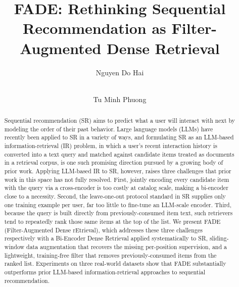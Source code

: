 \documentclass[runningheads]{llncs}
\begin{document}
%
\title{FADE: Rethinking Sequential Recommendation as Filter-Augmented Dense Retrieval}
%
%
\author{Nguyen Do Hai \and \\  Tu Minh Phuong}
%
%
%
\maketitle
%
\begin{abstract}
Sequential recommendation (SR) aims to predict what a user will interact with next by modeling the order of their past behavior. Large language models (LLMs) have recently been applied to SR in a variety of ways, and formulating SR as an LLM-based information-retrieval (IR) problem, in which a user's recent interaction history is converted into a text query and matched against candidate items treated as documents in a retrieval corpus, is one such promising direction pursued by a growing body of prior work. Applying LLM-based IR to SR, however, raises three challenges that prior work in this space has not fully resolved. First, jointly encoding every candidate item with the query via a cross-encoder is too costly at catalog scale, making a bi-encoder close to a necessity. Second, the leave-one-out protocol standard in SR supplies only one training example per user, far too little to fine-tune an LLM-scale encoder. Third, because the query is built directly from previously-consumed item text, such retrievers tend to repeatedly rank those same items at the top of the list. We present FADE (Filter-Augmented Dense rEtrieval), which addresses these three challenges respectively with a Bi-Encoder Dense Retrieval applied systematically to SR, sliding-window data augmentation that recovers the missing per-position supervision, and a lightweight, training-free filter that removes previously-consumed items from the ranked list. Experiments on three real-world datasets show that FADE substantially outperforms prior LLM-based information-retrieval approaches to sequential recommendation.

\end{abstract}
%
%
%
\end{document}
